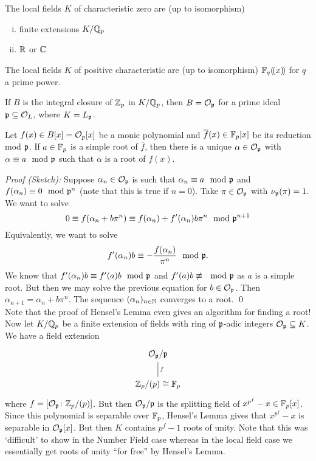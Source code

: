 \begin{thm}
The local fields $K$ of characteristic zero are (up to isomorphism)
\begin{enumerate}[(i)]
\item finite extensions $K/\mathbb{Q}_p$ 
\item $\mathbb{R}$ or $\mathbb{C}$
\end{enumerate}
The local fields $K$ of positive characteristic are (up to isomorphism) $\mathbb{F}_q(\!(x)\!)$ for $q$ a prime power.
\end{thm}

If $B$ is the integral closure of $\mathbb{Z}_p$ in $K/\mathbb{Q}_p$, then $B=\mathcal{O}_{\mathfrak{p}}$ for a prime ideal $\mathfrak{p} \subseteq \mathcal{O}_L$, where $K=L_{\mathfrak{p}}$. 


\begin{lem} \label{lem:hen}
Let $f(x) \in B[x]=\mathcal{O}_p[x]$ be a monic polynomial and $\overline{f}(x) \in \mathbb{F}_p[x]$ be its reduction mod $\mathfrak{p}$. If $a \in \mathbb{F}_p$ is a simple root of $\overline{f}$, then there is a unique $\alpha \in \mathcal{O}_{\mathfrak{p}}$ with $\alpha \equiv a \mod {\mathfrak{p}}$ such that $\alpha$ is a root of $f(x)$. 
\end{lem} 

\noindent \emph{Proof (Sketch): } Suppose $\alpha_n \in \mathcal{O}_{\mathfrak{p}}$ is such that $\alpha_n \equiv a \mod {\mathfrak{p}}$ and $f(\alpha_n) \equiv 0 \mod {\mathfrak{p}}^n$ (note that this is true if $n=0$). Take $\pi \in \mathcal{O}_{\mathfrak{p}}$ with $\nu_{\mathfrak{p}}(\pi)=1$. We want to solve 
	\[
	0 \equiv f(\alpha_n+b\pi^n) \equiv f(\alpha_n) + f'(\alpha_n)b\pi^n \mod {\mathfrak{p}}^{n+1}
	\]
Equivalently, we want to solve
	\[
	f'(\alpha_n)b \equiv - \dfrac{f(\alpha_n)}{\pi^n} \mod {\mathfrak{p}}.
	\]
We know that $f'(\alpha_n)b \equiv f'(a)b \mod {\mathfrak{p}}$ and $f'(a)b \not\equiv \mod {\mathfrak{p}}$ as $a$ is a simple root. But then we may solve the previous equation for $b \in \mathcal{O}_{\mathfrak{p}}$. Then $\alpha_{n+1}=\alpha_n+b\pi^n$. The sequence $(\alpha_n)_{n \in \mathbb{N}}$ converges to a root. \qed \\

Note that the proof of Hensel's Lemma even gives an algorithm for finding a root! Now let $K/\mathbb{Q}_p$ be a finite extension of fields with ring of $\mathfrak{p}$-adic integers $\mathcal{O}_{\mathfrak{p}} \subseteq K$. We have a field extension
	\[
	\begin{tikzcd}
	\O_\p/\p \arrow[dash]{d}{f} \\
	\Z_p/(p) \cong \F_p 
	\end{tikzcd}
	\]
where $f=[\mathcal{O}_{\mathfrak{p}} \colon \mathbb{Z}_p/(p)]$. But then $\mathcal{O}_{\mathfrak{p}}/\mathfrak{p}$ is the splitting field of $x^{p^f}-x \in \mathbb{F}_p[x]$. Since this polynomial is separable over $\mathbb{F}_p$, Hensel's Lemma gives that $x^{p^f}-x$ is separable in $\mathcal{O}_{\mathfrak{p}}[x]$. But then $K$ contains $p^f-1$ roots of unity. Note that this was `difficult' to show in the Number Field case whereas in the local field case we essentially get roots of unity ``for free'' by Hensel's Lemma. 



